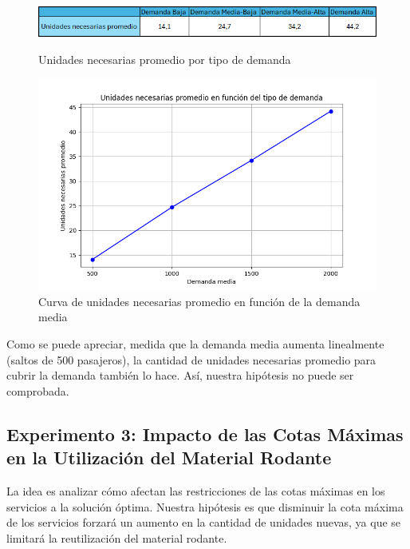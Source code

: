 \documentclass{article}
\begin{document}
\begin{figure}[H]
   \centering
    \begin{minipage}{0.45\textwidth}
        \centering
        \includegraphics[width=\textwidth]{exp2/unidades_promedio.png}
        \caption{Unidades necesarias promedio por tipo de demanda}
        \label{fig:grafico1}
    \end{minipage}
    \hfill
    \begin{minipage}{0.45\textwidth}
        \centering
        \includegraphics[width=\textwidth]{exp2/plot_unidades_promedio.png}
        \caption{Curva de unidades necesarias promedio en función de la demanda media}
        \label{fig:grafico2}
    \end{minipage}
    \label{fig:dos_graficos}
\end{figure}

Como se puede apreciar, medida que la demanda media aumenta linealmente (saltos de 500 pasajeros), la cantidad de unidades necesarias promedio para cubrir la demanda también lo hace. Así, nuestra hipótesis no puede ser comprobada.

\subsection*{Experimento 3: Impacto de las Cotas Máximas en la Utilización del Material Rodante}

La idea es analizar cómo afectan las restricciones de las cotas máximas en los servicios a la solución óptima. Nuestra hipótesis es que disminuir la cota máxima de los servicios forzará un aumento en la cantidad de unidades nuevas, ya que se limitará la reutilización del material rodante.
\end{document}

